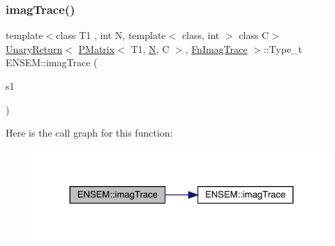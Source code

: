 \subsubsection{\texorpdfstring{imagTrace()}{imagTrace()}}
{\footnotesize\ttfamily template$<$class T1 , int N, template$<$ class, int $>$ class C$>$ \\
\mbox{\hyperlink{structENSEM_1_1UnaryReturn}{Unary\+Return}}$<$ \mbox{\hyperlink{classENSEM_1_1PMatrix}{P\+Matrix}}$<$ T1, \mbox{\hyperlink{adat__devel_2lib_2hadron_2operator__name__util_8cc_a7722c8ecbb62d99aee7ce68b1752f337}{N}}, C $>$, \mbox{\hyperlink{structENSEM_1_1FnImagTrace}{Fn\+Imag\+Trace}} $>$\+::Type\+\_\+t E\+N\+S\+E\+M\+::imag\+Trace (\begin{DoxyParamCaption}\item[{const \mbox{\hyperlink{classENSEM_1_1PMatrix}{P\+Matrix}}$<$ T1, \mbox{\hyperlink{adat__devel_2lib_2hadron_2operator__name__util_8cc_a7722c8ecbb62d99aee7ce68b1752f337}{N}}, C $>$ \&}]{s1 }\end{DoxyParamCaption})\hspace{0.3cm}{\ttfamily [inline]}}

Here is the call graph for this function\+:\nopagebreak
\begin{figure}[H]
\begin{center}
\leavevmode
\includegraphics[width=324pt]{df/d0a/group__primmatrix_gaa17cf25ee54da2665418c0cfbccc0ae9_cgraph}
\end{center}
\end{figure}
\mbox{\label{group__primmatrix_ga8ba784b1249c948dcff5b8fe086e2eb5}} 
